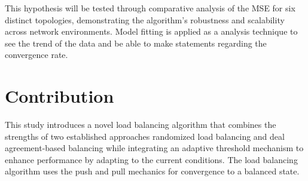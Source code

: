 This hypothesis will be tested through comparative analysis of the MSE for six distinct topologies, demonstrating the algorithm's robustness and scalability across network environments. Model fitting is applied as a analysis technique to see the trend of the data and be able to make statements regarding the convergence rate.

\section{Contribution}\label{sec:contribution}
This study introduces a novel load balancing algorithm that combines the strengths of two established approaches randomized load balancing and deal agreement-based balancing while integrating an adaptive threshold mechanism to enhance performance by adapting to the current conditions. The load balancing algorithm uses the push and pull mechanics for convergence to a balanced state. 